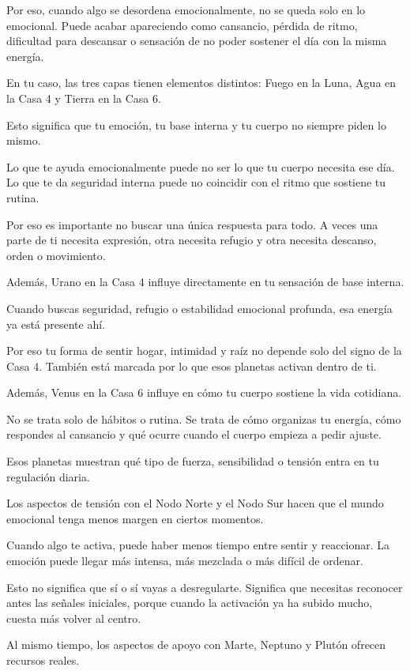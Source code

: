 \documentclass[11pt,a4paper]{article}
\begin{document}
Por eso, cuando algo se desordena emocionalmente, no se queda solo en lo emocional. Puede acabar apareciendo como cansancio, pérdida de ritmo, dificultad para descansar o sensación de no poder sostener el día con la misma energía.

En tu caso, las tres capas tienen elementos distintos: Fuego en la Luna, Agua en la Casa 4 y Tierra en la Casa 6.

Esto significa que tu emoción, tu base interna y tu cuerpo no siempre piden lo mismo.

Lo que te ayuda emocionalmente puede no ser lo que tu cuerpo necesita ese día. Lo que te da seguridad interna puede no coincidir con el ritmo que sostiene tu rutina.

Por eso es importante no buscar una única respuesta para todo. A veces una parte de ti necesita expresión, otra necesita refugio y otra necesita descanso, orden o movimiento.

Además, Urano en la Casa 4 influye directamente en tu sensación de base interna.

Cuando buscas seguridad, refugio o estabilidad emocional profunda, esa energía ya está presente ahí.

Por eso tu forma de sentir hogar, intimidad y raíz no depende solo del signo de la Casa 4. También está marcada por lo que esos planetas activan dentro de ti.

Además, Venus en la Casa 6 influye en cómo tu cuerpo sostiene la vida cotidiana.

No se trata solo de hábitos o rutina. Se trata de cómo organizas tu energía, cómo respondes al cansancio y qué ocurre cuando el cuerpo empieza a pedir ajuste.

Esos planetas muestran qué tipo de fuerza, sensibilidad o tensión entra en tu regulación diaria.

Los aspectos de tensión con el Nodo Norte y el Nodo Sur hacen que el mundo emocional tenga menos margen en ciertos momentos.

Cuando algo te activa, puede haber menos tiempo entre sentir y reaccionar. La emoción puede llegar más intensa, más mezclada o más difícil de ordenar.

Esto no significa que sí o sí vayas a desregularte. Significa que necesitas reconocer antes las señales iniciales, porque cuando la activación ya ha subido mucho, cuesta más volver al centro.

Al mismo tiempo, los aspectos de apoyo con Marte, Neptuno y Plutón ofrecen recursos reales.
\end{document}

